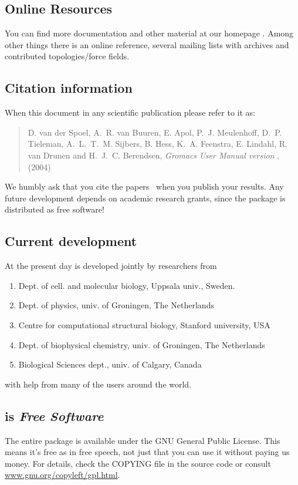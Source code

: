 \documentclass[11pt,a4paper,twoside]{gmxmanual}
\begin{document}
\subsection*{Online Resources}
You can find more documentation and other material at our homepage
\wwwpage. Among other things there is an online reference, several
{\gromacs} mailing lists with archives and contributed
topologies/force fields.

\subsection*{Citation information}
When  this document in any scientific publication
please refer to it as:
\begin{quote}
\raggedright
D. van der Spoel, A.~R. van Buuren, E. Apol, P.~J. Meulenhoff, D.~P.
Tieleman, A.~L.~T.~M. Sij\-bers, B. Hess, K.~A. Feenstra, E. Lindahl,
R. van Drunen and H.~J.~C. Berendsen,
\hspace{0.3em} {\em Gromacs {U}ser {M}anual version \gmxver},
\hspace{0.3em} {\wwwpage} (2004)
\end{quote}
We humbly ask that you cite the {\gromacs}
papers~\cite{Berendsen95a,Lindahl2001a} when you publish your
results. Any future development depends on academic research grants,
since the package is distributed as free software!

\subsection*{Current development}
At the present day {\gromacs} is developed jointly by researchers from
\begin{enumerate}
\item Dept. of cell. and molecular biology, Uppsala univ., Sweden.
\item Dept. of physics, univ. of Groningen, The Netherlands
\item Centre for computational structural biology, Stanford university, USA
\item Dept. of biophysical chemistry, univ. of Groningen, The Netherlands
\item Biological Sciences dept., univ. of Calgary, Canada
\end{enumerate}
with help from many of the users around the world.

\subsection*{{\gromacs} is {\em Free Software}}
The entire {\gromacs} package is available under the GNU General
Public License. This means it's free as in free speech, not just that
you can use it without paying us money. For details, check the COPYING
file in the source code or consult
\href{http://www.gnu.org/copyleft/gpl.html}{www.gnu.org/copyleft/gpl.html}.
\end{document}
